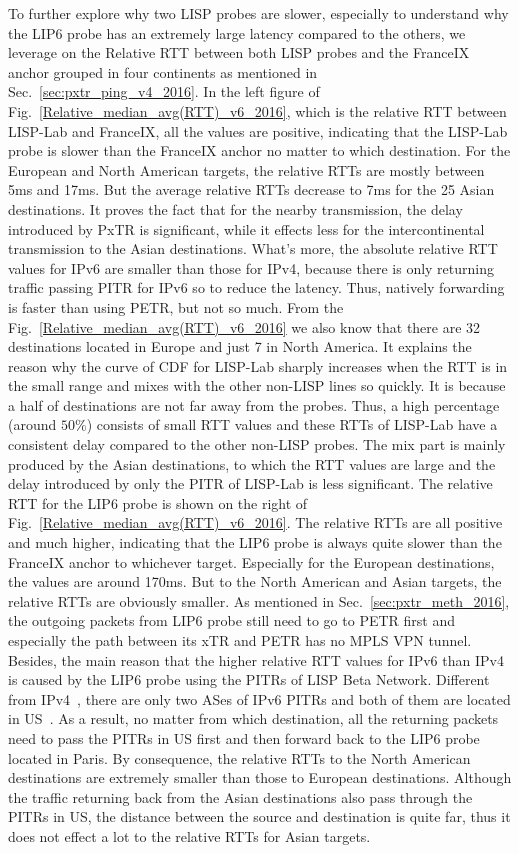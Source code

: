 To further explore why two LISP probes are slower, especially to understand why the LIP6 probe has an extremely large latency compared to the others, we leverage on the Relative RTT between both LISP probes and the FranceIX anchor grouped in four continents as mentioned in Sec.~\ref{sec:pxtr_ping_v4_2016}. In the left figure of Fig.~\ref{Relative_median_avg(RTT)_v6_2016}, which is the relative RTT between LISP-Lab and FranceIX, all the values are positive, indicating that the LISP-Lab probe is slower than the FranceIX anchor no matter to which destination. For the European and North American targets, the relative RTTs are mostly between 5ms and 17ms. But the average relative RTTs decrease to 7ms for the 25 Asian destinations. It proves the fact that for the nearby transmission, the delay introduced by PxTR is significant, while it effects less for the intercontinental transmission to the Asian destinations. What's more, the absolute relative RTT values for IPv6 are smaller than those for IPv4, because there is only returning traffic passing PITR for IPv6 so to reduce the latency. Thus, natively forwarding is faster than using PETR, but not so much. From the Fig.~\ref{Relative_median_avg(RTT)_v6_2016} we also know that there are 32 destinations located in Europe and just 7 in North America. It explains the reason why the curve of CDF for LISP-Lab sharply increases when the RTT is in the small range and mixes with the other non-LISP lines so quickly. It is because a half of destinations are not far away from the probes. Thus, a high percentage (around $50\%$) consists of small RTT values and these RTTs of LISP-Lab have a consistent delay compared to the other non-LISP probes. The mix part is mainly produced by the Asian destinations, to which the RTT values are large and the delay introduced by only the PITR of LISP-Lab is less significant. The relative RTT for the LIP6 probe is shown on the right of Fig.~\ref{Relative_median_avg(RTT)_v6_2016}. The relative RTTs are all positive and much higher, indicating that the LIP6 probe is always quite slower than the FranceIX anchor to whichever target. Especially for the European destinations, the values are around 170ms. But to the North American and Asian targets, the relative RTTs are obviously smaller. As mentioned in Sec.~\ref{sec:pxtr_meth_2016}, the outgoing packets from LIP6 probe still need to go to PETR first and especially the path between its xTR and PETR has no MPLS VPN tunnel. Besides, the main reason that the higher relative RTT values for IPv6 than IPv4 is caused by the LIP6 probe using the PITRs of LISP Beta Network. Different from IPv4~\cite{bgpv4}, there are only two ASes of IPv6 PITRs and both of them are located in US~\cite{bgpv6}. As a result, no matter from which destination, all the returning packets need to pass the PITRs in US first and then forward back to the LIP6 probe located in Paris. By consequence, the relative RTTs to the North American destinations are extremely smaller than those to European destinations. Although the traffic returning back from the Asian destinations also pass through the PITRs in US, the distance between the source and destination is quite far, thus it does not effect a lot to the relative RTTs for Asian targets.

